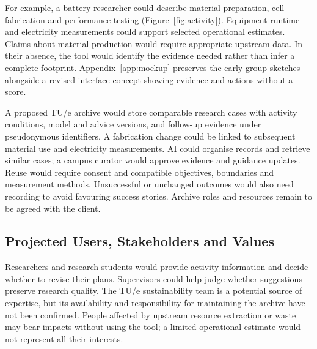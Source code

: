 \documentclass[11pt,a4paper]{article}
\begin{document}
For example, a battery researcher could describe material preparation, cell fabrication and performance testing (Figure~\ref{fig:activity}). Equipment runtime and electricity measurements could support selected operational estimates. Claims about material production would require appropriate upstream data. In their absence, the tool would identify the evidence needed rather than infer a complete footprint. Appendix~\ref{app:mockup} preserves the early group sketches alongside a revised interface concept showing evidence and actions without a score.

A proposed TU/e archive would store comparable research cases with activity conditions, model and advice versions, and follow-up evidence under pseudonymous identifiers. A fabrication change could be linked to subsequent material use and electricity measurements. AI could organise records and retrieve similar cases; a campus curator would approve evidence and guidance updates. Reuse would require consent and compatible objectives, boundaries and measurement methods. Unsuccessful or unchanged outcomes would also need recording to avoid favouring success stories. Archive roles and resources remain to be agreed with the client.


\FloatBarrier
\subsection{Projected Users, Stakeholders and Values}
Researchers and research students would provide activity information and decide whether to revise their plans. Supervisors could help judge whether suggestions preserve research quality. The TU/e sustainability team is a potential source of expertise, but its availability and responsibility for maintaining the archive have not been confirmed. People affected by upstream resource extraction or waste may bear impacts without using the tool; a limited operational estimate would not represent all their interests.
\end{document}
